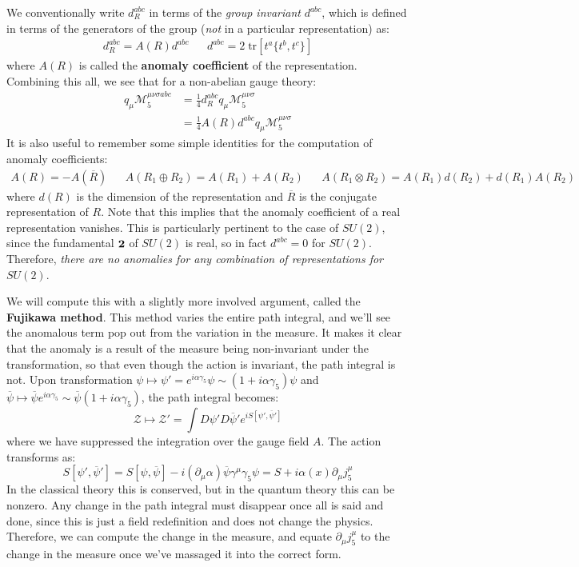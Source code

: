 \documentclass[11pt, oneside]{article}   	%
\theoremstyle{definition}
\numberwithin{equation}{subsection}		%
\begin{document}
We conventionally write $d_R^{abc}$ in terms of the \textit{group invariant} $d^{abc}$, which is defined in terms of the generators of the 
group (\textit{not} in a particular representation) as:
\begin{align}
	d_R^{abc} = A(R) d^{abc} && d^{abc} = 2\;\mathrm{tr}[t^a \{t^b, t^c\}]
\end{align}
where $A(R)$ is called the \textbf{anomaly coefficient} of the representation. Combining this all, we see that for a non-abelian gauge theory:
\begin{align}
	q_\mu \mathcal M_5^{\mu\nu\sigma abc} &= \frac{1}{4} d_R^{abc} q_\mu\mathcal M_5^{\mu\nu\sigma} \\
	&= \frac{1}{4} A(R) d^{abc} q_\mu\mathcal M_5^{\mu\nu\sigma}
\end{align}
It is also useful to remember some simple identities for the computation of anomaly coefficients:
\begin{align}
	A(R) = - A(\overline R) && A(R_1\oplus R_2) = A(R_1) + A(R_2) && A(R_1\otimes R_2) = A(R_1) d(R_2) + d(R_1) A(R_2)
\end{align}
where $d(R)$ is the dimension of the representation and $\overline R$ is the conjugate representation of $R$. Note that 
this implies that the anomaly coefficient of a real representation vanishes. This is particularly pertinent to the case of $SU(2)$, 
since the fundamental $\bf 2$ of $SU(2)$ is real, so in fact $d^{abc} = 0$ for $SU(2)$. Therefore, \textit{there are no anomalies for 
any combination of representations for $SU(2)$}. 

We will compute this with a slightly more involved argument, called the \textbf{Fujikawa method}. This method varies the entire path integral, and we'll 
see the anomalous term pop out from the variation in the measure. It makes it clear that the anomaly is a result of the measure being non-invariant under the 
transformation, so that even though the action is invariant, the path integral is not. Upon transformation $\psi\mapsto \psi' = e^{i\alpha\gamma_5}\psi\sim 
(1 + i\alpha\gamma_5)\psi$ and $\overline\psi\mapsto \overline\psi e^{i\alpha\gamma_5}\sim \overline\psi (1 + i\alpha\gamma_5)$, the path integral becomes:
\begin{equation}
	\mathcal Z\mapsto \mathcal Z' = \int D\psi' D\overline\psi' e^{i S[\psi', \overline\psi']}
\end{equation}
where we have suppressed the integration over the gauge field $A$. The action transforms as:
\begin{equation}
	S[\psi', \overline\psi'] = S[\psi, \overline\psi] - i(\partial_\mu\alpha) \overline\psi\gamma^\mu\gamma_5\psi = S + i\alpha(x)\partial_\mu j_5^\mu
	\label{eq:action_transformation_gamma5}
\end{equation}
In the classical theory this is conserved, but in the quantum theory this can be nonzero. Any change in the path integral must disappear once all is 
said and done, since this is just a field redefinition and does not change the physics. Therefore, we can compute the change in the measure, and 
equate $\partial_\mu j_5^\mu$ to the change in the measure once we've massaged it into the correct form. 
\end{document}
